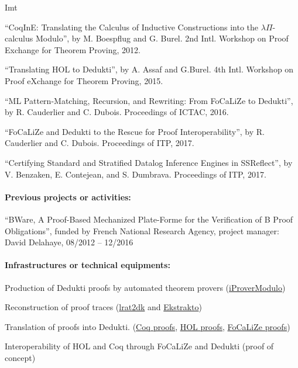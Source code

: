 \begin{sitedescription}{Imt}
\begin{compactitem}
 \item ``CoqInE: Translating the Calculus of Inductive Constructions
   into the $\lambda{}\Pi{}$-calculus Modulo'', by M. Boespflug and
   G. Burel. 2nd Intl. Workshop on Proof Exchange for Theorem Proving,
   2012.
 \item ``Translating HOL to Dedukti'', by A. Assaf and G.Burel. 4th Intl. Workshop on Proof eXchange for Theorem Proving, 2015.
 \item ``ML Pattern-Matching, Recursion, and Rewriting: From FoCaLiZe to Dedukti'', by R. Cauderlier and C. Dubois. Proceedings of ICTAC, 2016.
 \item ``FoCaLiZe and Dedukti to the Rescue for Proof Interoperability'', by R. Cauderlier and C. Dubois. Proceedings of ITP, 2017.
 \item ``Certifying Standard and Stratified Datalog Inference Engines in SSReflect'', by V. Benzaken, E. Contejean, and S. Dumbrava. Proceedings of ITP, 2017.
\end{compactitem}

\paragraph*{Previous projects or activities:}

\begin{compactitem}
\item ``BWare, A Proof-Based Mechanized Plate-Forme for the Verification of B Proof Obligations'',
funded by French National Research Agency, project manager: David
Delahaye, 08/2012 -- 12/2016
\end{compactitem}

\paragraph*{Infrastructures or technical equipments:}

\begin{compactitem}
\item Production of Dedukti proofs by automated theorem provers (\href{http://www.ensiie.fr/~guillaume.burel/blackandwhite_iProverModulo.html.en}{iProverModulo})
\item Reconstruction of proof traces
  (\href{https://github.com/gburel/lrat2dk}{lrat2dk} and \href{https://github.com/Deducteam/ekstrakto}{Ekstrakto})
\item Translation of proofs into Dedukti. (\href{http://www.ensiie.fr/~guillaume.burel/blackandwhite_coqInE.html.en}{Coq
  proofs}, \href{http://deducteam.gforge.inria.fr/holide/}{HOL
  proofs}, \href{http://deducteam.gforge.inria.fr/focalide/}{FoCaLiZe proofs})
  \item Interoperability of HOL and Coq through FoCaLiZe and Dedukti (proof of concept)
\end{compactitem}


\end{sitedescription}

